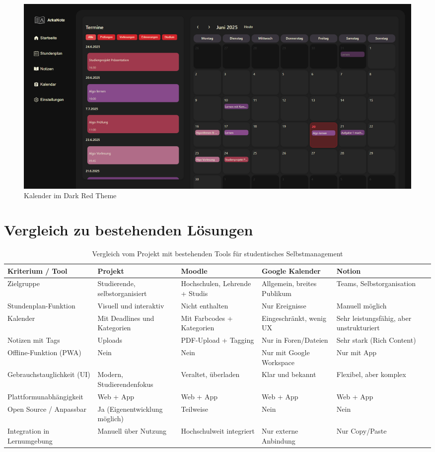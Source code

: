 \begin{figure}[H]
  \centering
  \includegraphics[width=1\textwidth]{./images/kalender-red.png}
  \caption{Kalender im Dark Red Theme}
  \label{fig:kalender-red}
\end{figure}

\section{Vergleich zu bestehenden Lösungen}
\begin{table}[H]
\centering
\scriptsize %
\renewcommand{\arraystretch}{1.3} %
\begin{tabularx}{\textwidth}{|p{3cm}|p{2.3cm}|p{2.5cm}|p{2.5cm}|p{2.5cm}|}
\hline
\textbf{Kriterium / Tool} & \textbf{Projekt} & \textbf{Moodle} & \textbf{Google Kalender} & \textbf{Notion} \\
\hline
Zielgruppe & Studierende, selbstorganisiert & Hochschulen, Lehrende + Studis & Allgemein, breites Publikum & Teams, Selbstorganisation \\
\hline
Stundenplan-Funktion & Visuell und interaktiv & Nicht enthalten & Nur Ereignisse & Manuell möglich \\
\hline
Kalender & Mit Deadlines und Kategorien & Mit Farbcodes + Kategorien & Eingeschränkt, wenig UX & Sehr leistungsfähig, aber unstrukturiert \\
\hline
Notizen mit Tags & Uploads & PDF-Upload + Tagging & Nur in Foren/Dateien & Sehr stark (Rich Content) \\
\hline
Offline-Funktion (PWA) & Nein & Nein & Nur mit Google Workspace & Nur mit App \\
\hline
Gebrauchstauglichkeit (UI) & Modern, Studierendenfokus & Veraltet, überladen & Klar und bekannt & Flexibel, aber komplex \\
\hline
Plattformunabhängigkeit & Web + App & Web + App & Web + App & Web + App \\
\hline
Open Source / Anpassbar & Ja (Eigenentwicklung möglich) & Teilweise & Nein & Nein \\
\hline
Integration in Lernumgebung & Manuell über Nutzung & Hochschulweit integriert & Nur externe Anbindung & Nur Copy/Paste \\
\hline
\end{tabularx}
\caption{Vergleich vom Projekt mit bestehenden Tools für studentisches Selbstmanagement}
\label{tab:toolvergleich}
\end{table}



